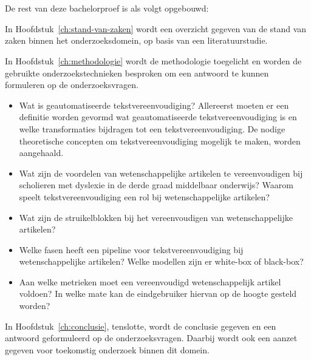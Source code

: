 
\section{}%
\label{sec:opzet-bachelorproef}


De rest van deze bachelorproef is als volgt opgebouwd:

In Hoofdstuk~\ref{ch:stand-van-zaken} wordt een overzicht gegeven van de stand van zaken binnen het onderzoeksdomein, op basis van een literatuurstudie.

In Hoofdstuk~\ref{ch:methodologie} wordt de methodologie toegelicht en worden de gebruikte onderzoekstechnieken besproken om een antwoord te kunnen formuleren op de onderzoeksvragen.


\begin{itemize}
	\item Wat is geautomatiseerde tekstvereenvoudiging? Allereerst moeten er een definitie worden gevormd wat geautomatiseerde tekstvereenvoudiging is en welke transformaties bijdragen tot een tekstvereenvoudiging. De nodige theoretische concepten om tekstvereenvoudiging mogelijk te maken, worden aangehaald. 
	\item Wat zijn de voordelen van wetenschappelijke artikelen te vereenvoudigen bij scholieren met dyslexie in de derde graad middelbaar onderwijs? Waarom speelt tekstvereenvoudiging een rol bij wetenschappelijke artikelen?
	\item Wat zijn de struikelblokken bij het vereenvoudigen van wetenschappelijke artikelen?
	\item Welke fasen heeft een pipeline voor tekstvereenvoudiging bij wetenschappelijke artikelen? Welke modellen zijn er white-box of black-box?
	\item Aan welke metrieken moet een vereenvoudigd wetenschappelijk artikel voldoen? In welke mate kan de eindgebruiker hiervan op de hoogte gesteld worden? 
\end{itemize}

In Hoofdstuk~\ref{ch:conclusie}, tenslotte, wordt de conclusie gegeven en een antwoord geformuleerd op de onderzoeksvragen. Daarbij wordt ook een aanzet gegeven voor toekomstig onderzoek binnen dit domein.